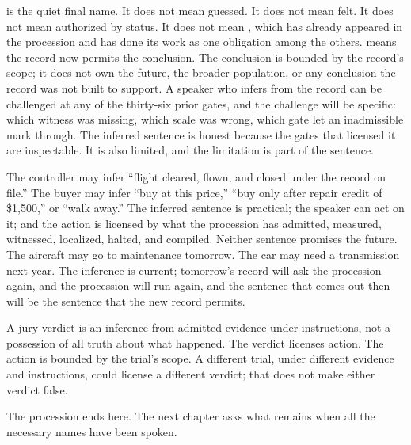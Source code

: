  is the quiet final name. It does not mean guessed. It
does not mean felt. It does not mean authorized by status. It does
not mean , which has already appeared in the procession
and has done its work as one obligation among the others.
 means the record now permits the conclusion. The
conclusion is bounded by the record's scope; it does not own the
future, the broader population, or any conclusion the record was not
built to support. A speaker who infers from the record can be
challenged at any of the thirty-six prior gates, and the challenge
will be specific: which witness was missing, which scale was wrong,
which gate let an inadmissible mark through. The inferred sentence is
honest because the gates that licensed it are inspectable. It is also
limited, and the limitation is part of the sentence.

The controller may infer ``flight cleared, flown, and closed under
the record on file.'' The buyer may infer ``buy at this price,'' ``buy
only after repair credit of \$1{,}500,'' or ``walk away.'' The
inferred sentence is practical; the speaker can act on it; and the
action is licensed by what the procession has admitted, measured,
witnessed, localized, halted, and compiled. Neither sentence promises
the future. The aircraft may go to maintenance tomorrow. The car may
need a transmission next year. The inference is current; tomorrow's
record will ask the procession again, and the procession will run
again, and the sentence that comes out then will be the sentence that
the new record permits.

A jury verdict is an inference from admitted evidence under
instructions, not a possession of all truth about what happened. The
verdict licenses action. The action is bounded by the trial's scope.
A different trial, under different evidence and instructions, could
license a different verdict; that does not make either verdict false.

The procession ends here. The next chapter asks what remains when
all the necessary names have been spoken.
